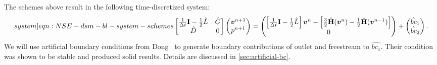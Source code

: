 \documentclass{article}
\numberwithin{equation}{section}
\begin{document}
The schemes above result in the following time-discretized system:
\begin{equation}\label[system]{eqn:NSE-dsm-bl-system-schemes}
	\begin{bmatrix}
		\frac{1}{\Delta t}\mathbf{I}-\frac{1}{2}\hat{L} & \hat{G} \\
		\hat{D} & 0
	\end{bmatrix}
	\begin{pmatrix}
		\boldsymbol{v}^{n+1} \\ 
		p^{n+1}
	\end{pmatrix}
	=
	\begin{pmatrix}
		\left[\frac{1}{\Delta t}\mathbf{I}-\frac{1}{2}\hat{L}\right] \boldsymbol{v}^n - \left[\frac{3}{2}\hat{\mathbf{H}}(\boldsymbol{v}^n) - \frac{1}{2}\hat{\mathbf{H}}(\boldsymbol{v}^{n-1})\right]\\
		0
	\end{pmatrix}
	+
	\begin{pmatrix}
		\hat{bc}_1\\
		\hat{bc}_2
	\end{pmatrix}.
\end{equation}
We will use artificial boundary conditions from Dong~\cite{Dong:2014} to generate boundary contributions of outlet and freestream to $\hat{bc_1}$. Their condition was shown to be stable and produced solid results. Details are discussed in \cref{sec:artificial-bc}.
\end{document}
